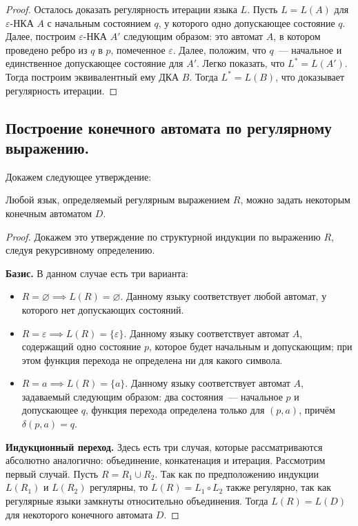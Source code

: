 \documentclass[a4paper,12pt]{article}
\begin{document}
\begin{proof}
		Осталось доказать регулярность итерации языка $L$. Пусть $L = L(A)$ для $\varepsilon$-НКА $A$ с начальным состоянием $q$, у которого одно допускающее состояние $q$. Далее, построим $\varepsilon$-НКА $A'$ следующим образом: это автомат $A$, в котором проведено ребро из $q$ в $p$, помеченное $\varepsilon$. Далее, положим, что $q$~--- начальное и единственное допускающее состояние для $A'$. Легко показать, что $L^* = L(A')$. Тогда построим эквивалентный ему ДКА $B$. Тогда $L^* = L(B)$, что доказывает регулярность итерации.  
	\end{proof}
	
	\subsection{Построение конечного автомата по регулярному выражению.}
	Докажем следующее утверждение:
	\begin{theorem}
		Любой язык, определяемый регулярным выражением $R$, можно задать некоторым конечным автоматом $D$.
	\end{theorem}
	\begin{proof}
		Докажем это утверждение по структурной индукции по выражению $R$, следуя рекурсивному определению.
		
		\textbf{Базис.} В данном случае есть три варианта:
		\begin{itemize}
			\item $R = \varnothing \implies L(R) = \varnothing$. Данному языку соответствует любой автомат, у которого нет допускающих состояний.
			
			\item $R = \varepsilon \implies L(R) = \{\varepsilon\}$. Данному языку соответствует автомат $A$, содержащий одно состояние $p$, которое будет начальным и допускающим; при этом функция перехода не определена ни для какого символа.
			
			\item $R = a \implies L(R) = \{a\}$. Данному языку соответствует автомат $A$, задаваемый следующим образом: два состояния~--- начальное $p$ и допускающее $q$, функция перехода определена только для $(p, a)$, причём $\delta(p, a) = q$.
		\end{itemize}
		
		\textbf{Индукционный переход.} Здесь есть три случая, которые рассматриваются абсолютно аналогично: объединение, конкатенация и итерация. Рассмотрим первый случай. Пусть $R = R_1 \cup R_2$. Так как по предположению индукции $L(R_1)$ и $L(R_2)$ регулярны, то $L(R) = L_1 \circ L_2$ также регулярно, так как регулярные языки замкнуты относительно объединения. Тогда $L(R) = L(D)$ для некоторого конечного автомата $D$.
	\end{proof}
\newpage
\end{document}
